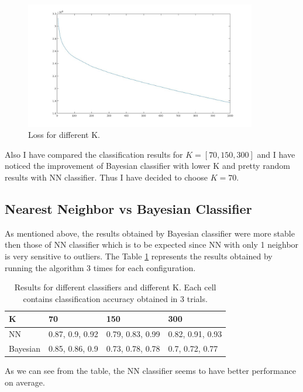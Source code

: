 \documentclass[paper=a4, fontsize=11pt]{scrartcl} %
\numberwithin{equation}{section} %
\numberwithin{figure}{section} %
\numberwithin{table}{section} %
\begin{document}
\begin{figure}
\centering
\includegraphics[width=0.9\textwidth]{loss_with_k.jpg}
\caption{Loss for different K.}
\label{fig:diff_k}
\end{figure}

Also I have compared the classification results for $K = [70, 150, 300]$ and I have noticed the improvement of Bayesian classifier with lower K and pretty random results with NN classifier. Thus I have decided to choose $K=70$.

\subsection{Nearest Neighbor vs Bayesian Classifier}

As mentioned above, the results obtained by Bayesian classifier were more stable then those of NN classifier which is to be expected since NN with only 1 neighbor is very sensitive to outliers. The Table \ref{tab:res} represents the results obtained by running the algorithm 3 times for each configuration.

\begin{table}
\begin{center}
    \begin{tabular}{| l | l | l | l |}
    \hline
    K & 70 & 150 & 300 \\ \hline
    NN & 0.87, 0.9, 0.92 & 0.79, 0.83, 0.99 & 0.82, 0.91, 0.93 \\ \hline
    Bayesian & 0.85, 0.86, 0.9 & 0.73, 0.78, 0.78 & 0.7, 0.72, 0.77 \\ \hline
    \end{tabular}
    \caption{Results for different classifiers and different K. Each cell contains classification accuracy obtained in 3 trials.}
    \label{tab:res}
\end{center}
\end{table}
 
As we can see from the table, the NN classifier seems to have better performance on average.
\end{document}
